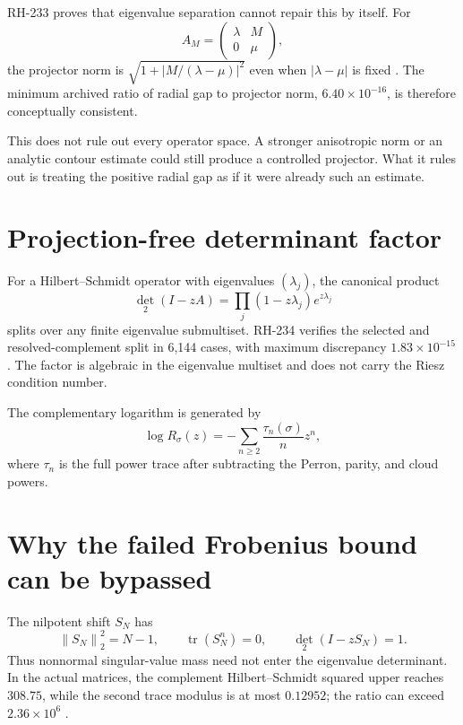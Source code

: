 \documentclass[11pt]{article}
\theoremstyle{remark}
\newcommand{\norm}[1]{\left\lVert#1\right\rVert}
\begin{document}
RH-233 proves that eigenvalue separation cannot repair this by itself.  For
\[
 A_M=\begin{pmatrix}\lambda&M\\0&\mu\end{pmatrix},
\]
the projector norm is
$\sqrt{1+|M/(\lambda-\mu)|^2}$ even when $|\lambda-\mu|$ is fixed
\citep{WangRH233,TrefethenEmbree2005}.  The minimum archived ratio of radial
gap to projector norm, $6.40\times10^{-16}$, is therefore conceptually
consistent.

This does not rule out every operator space.  A stronger anisotropic norm or
an analytic contour estimate could still produce a controlled projector.
What it rules out is treating the positive radial gap as if it were already
such an estimate.

\section{Projection-free determinant factor}

For a Hilbert--Schmidt operator with eigenvalues $(\lambda_j)$, the canonical
product
\[
 \det_2(I-zA)=\prod_j(1-z\lambda_j)e^{z\lambda_j}
\]
splits over any finite eigenvalue submultiset.  RH-234 verifies the selected
and resolved-complement split in 6,144 cases, with maximum discrepancy
$1.83\times10^{-15}$ \citep{WangRH234,Simon2005}.  The factor is algebraic in
the eigenvalue multiset and does not carry the Riesz condition number.

The complementary logarithm is generated by
\begin{equation}\label{eq:log}
 \log R_\sigma(z)
 =-\sum_{n\ge2}\frac{\tau_n(\sigma)}{n}z^n,
\end{equation}
where $\tau_n$ is the full power trace after subtracting the Perron, parity,
and cloud powers.

\section{Why the failed Frobenius bound can be bypassed}

The nilpotent shift $S_N$ has
\[
 \norm{S_N}_2^2=N-1,
 \qquad
 \operatorname{tr}(S_N^n)=0,
 \qquad
 \det_2(I-zS_N)=1.
\]
Thus nonnormal singular-value mass need not enter the eigenvalue determinant.
In the actual matrices, the complement Hilbert--Schmidt squared upper reaches
$308.75$, while the second trace modulus is at most $0.12952$; the ratio can
exceed $2.36\times10^6$ \citep{WangRH235}.
\end{document}
